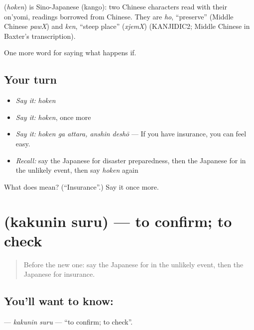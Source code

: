 \begin{cousinweb}
\textbf{} (\emph{hoken}) is Sino-Japanese (kango): two Chinese characters read with their on'yomi, readings borrowed from Chinese. They are \emph{ho}, \textquotedblleft{}preserve\textquotedblright{} (Middle Chinese \emph{pawX}) and \emph{ken}, \textquotedblleft{}steep place\textquotedblright{} (\emph{xjemX}) (KANJIDIC2; Middle Chinese in Baxter's transcription).
\end{cousinweb}

\begin{grammarlens}[title={What you've built}]
One more word for saying what happens if.
\end{grammarlens}

\subsection*{Your turn}
\begin{itemize}
\raggedright
  \item \emph{Say it:} \emph{hoken}
  \item \emph{Say it:} \emph{hoken}, once more
  \item \emph{Say it:} \emph{hoken ga attara, anshin deshō} — If you have insurance, you can feel easy.
  \item \emph{Recall:} say the Japanese for disaster preparedness, then the Japanese for in the unlikely event, then say \emph{hoken} again
\end{itemize}

\begin{tcolorbox}[breakable,colback=teal!4,colframe=teal!35!black,title={Before you move on}]
What does  mean? (\textquotedblleft{}Insurance\textquotedblright{}.) Say it once more.
\end{tcolorbox}
\section[\texorpdfstring{\ja{かくにんする} (kakunin suru)}{かくにんする (kakunin suru)}]{ (kakunin suru) — to confirm; to check}

\label{lesson:JA-C351-kakunin-suru}



\begin{quote}
Before the new one: say the Japanese for in the unlikely event, then the Japanese for insurance.
\end{quote}

\subsection*{You'll want to know: }
\textbf{} — \emph{kakunin suru} — \textquotedblleft{}to confirm; to check\textquotedblright{}.

